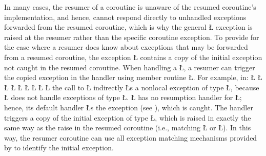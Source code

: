 \documentclass[openright,twoside]{report}
\begin{document}
\begin{sloppypar}
In many cases, the resumer of a coroutine is unaware of the resumed coroutine's implementation, and hence, cannot respond directly to unhandled exceptions forwarded from the resumed coroutine, which is why the general \LGinlinetrue\LGbegin\lgrinde\L{}\endlgrinde\LGend{} exception is raised at the resumer rather than the specific coroutine exception.
To provide for the case where a resumer does know about exceptions that may be forwarded from a resumed coroutine, the exception \LGinlinetrue\LGbegin\lgrinde\L{}\endlgrinde\LGend{} contains a copy of the initial exception not caught in the resumed coroutine.
When handling a \LGinlinetrue\LGbegin\lgrinde\L{}\endlgrinde\LGend{}, a resumer can trigger the copied exception in the handler using member routine \LGinlinetrue\LGbegin\lgrinde\L{}\endlgrinde\LGend{}.
For example, in:
\LGinlinefalse\LGbegin\lgrinde
\L{}
\L{}
\L{\LB{}}
\L{\LB{}}
\L{\LB{}}
\CE{}\L{\LB{}}
\L{\LB{}}
\CE{}\L{\LB{}}
\L{\LB{\}}}
\endlgrinde\LGend
the call to \LGinlinetrue\LGbegin\lgrinde\L{}\endlgrinde\LGend{} indirectly \LGinlinetrue\LGbegin\lgrinde\L{}\endlgrinde\LGend{}s a nonlocal exception of type \LGinlinetrue\LGbegin\lgrinde\L{}\endlgrinde\LGend{}, because \LGinlinetrue\LGbegin\lgrinde\L{}\endlgrinde\LGend{} does not handle exceptions of type \LGinlinetrue\LGbegin\lgrinde\L{}\endlgrinde\LGend{}.
\LGinlinetrue\LGbegin\lgrinde\L{}\endlgrinde\LGend{} has no resumption handler for \LGinlinetrue\LGbegin\lgrinde\L{}\endlgrinde\LGend{};
hence, its default handler \LGinlinetrue\LGbegin\lgrinde\L{}\endlgrinde\LGend{}s the exception (see ), which is caught. 
The handler triggers a copy of the initial exception of type \LGinlinetrue\LGbegin\lgrinde\L{}\endlgrinde\LGend{}, which is raised in exactly the same way as the raise in the resumed coroutine (i.e., matching \LGinlinetrue\LGbegin\lgrinde\L{}\endlgrinde\LGend{} or \LGinlinetrue\LGbegin\lgrinde\L{}\endlgrinde\LGend{}).
In this way, the resumer coroutine can use all exception matching mechanisms provided by \uC to identify the initial exception.
\end{sloppypar}
\end{document}
